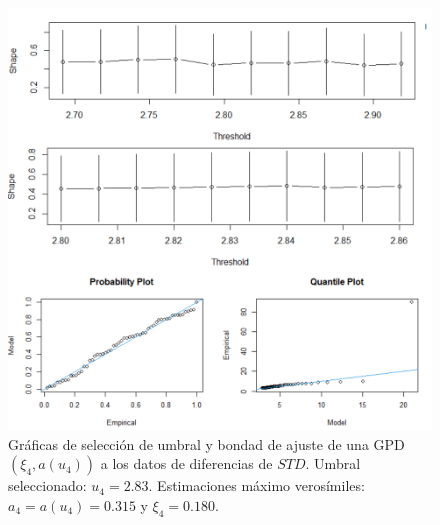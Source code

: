 \documentclass[10.5pt,notitlepage]{article}
\theoremstyle{plain}
\begin{document}
\begin{figure}[htb]
    \centering
    \includegraphics[scale = 0.4]{incisoc/DAp1STD.png}
    \caption{Gráficas de selección de umbral y bondad de ajuste de una GPD\((\xi_4,a(u_4))\) a los datos de diferencias de \(STD\). Umbral seleccionado: \(u_4 = 2.83\). Estimaciones máximo verosímiles: \(a_4 =a(u_4) = 0.315\) y \(\xi_4 =  0.180\).}
    \label{fig:24} 
\end{figure}
\end{document}
